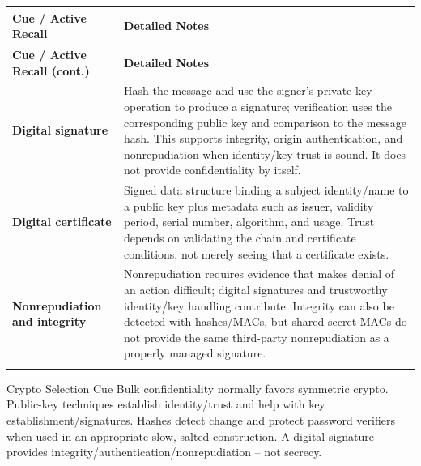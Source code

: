 \documentclass[10pt,letterpaper]{article}
\makeatletter
\newenvironment{cornell}{\rowcolors{2}{white}{notebg}\begin{longtable}{@{}>{\raggedright\arraybackslash\columncolor{cuebg}\color{navy}\bfseries}p{0.285\textwidth}>{\raggedright\arraybackslash}p{0.65\textwidth}@{}}
\rowcolor{navy}\color{white}\textbf{Cue / Active Recall} & \color{white}\textbf{Detailed Notes}\\ \hline\endfirsthead
\rowcolor{navy}\color{white}\textbf{Cue / Active Recall (cont.)} & \color{white}\textbf{Detailed Notes}\\ \hline\endhead}{\end{longtable}}
\newcommand{\noterow}[2]{#1 & #2\\\arrayrulecolor{line}\hline}
\makeatother
\begin{document}
\begin{cornell}
\noterow{Digital signature}{Hash the message and use the signer's private-key operation to produce a signature; verification uses the corresponding public key and comparison to the message hash. This supports integrity, origin authentication, and nonrepudiation when identity/key trust is sound. It does not provide confidentiality by itself.}
\noterow{Digital certificate}{Signed data structure binding a subject identity/name to a public key plus metadata such as issuer, validity period, serial number, algorithm, and usage. Trust depends on validating the chain and certificate conditions, not merely seeing that a certificate exists.}
\noterow{Nonrepudiation and integrity}{Nonrepudiation requires evidence that makes denial of an action difficult; digital signatures and trustworthy identity/key handling contribute. Integrity can also be detected with hashes/MACs, but shared-secret MACs do not provide the same third-party nonrepudiation as a properly managed signature.}
\end{cornell}

\begin{exambox}{Crypto Selection Cue}
Bulk confidentiality normally favors symmetric crypto. Public-key techniques establish identity/trust and help with key establishment/signatures. Hashes detect change and protect password verifiers when used in an appropriate slow, salted construction. A digital signature provides integrity/authentication/nonrepudiation -- not secrecy.
\end{exambox}
\end{document}

